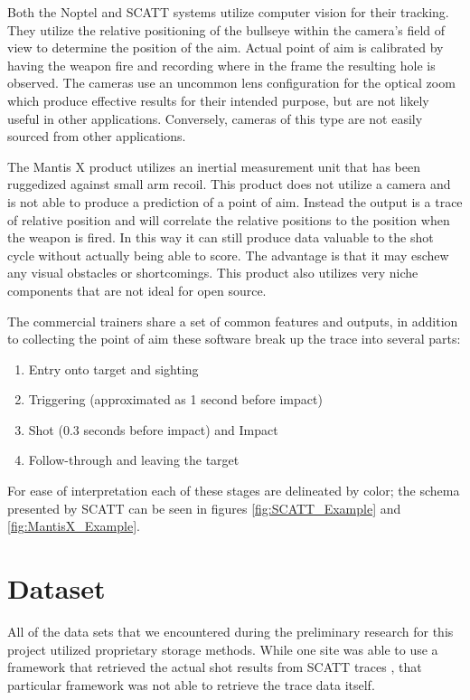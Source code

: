 \documentclass[conference]{IEEEtran}
\begin{document}
Both the Noptel and SCATT systems utilize computer vision for their tracking.
They utilize the relative positioning of the bullseye within the camera's field of view to determine the position of the aim.
Actual point of aim is calibrated by having the weapon fire and recording where in the frame the resulting hole is observed.
The cameras use an uncommon lens configuration for the optical zoom which produce effective results for their intended purpose, but are not likely useful in other applications.
Conversely, cameras of this type are not easily sourced from other applications.

The Mantis X \cite{mantisx} product utilizes an inertial measurement unit that has been ruggedized against small arm recoil. 
This product does not utilize a camera and is not able to produce a prediction of a point of aim.
Instead the output is a trace of relative position and will correlate the relative positions to the position when the weapon is fired.
In this way it can still produce data valuable to the shot cycle without actually being able to score.
The advantage is that it may eschew any visual obstacles or shortcomings.
This product also utilizes very niche components that are not ideal for open source.

The commercial trainers share a set of common features and outputs,
in addition to collecting the point of aim these software break up the trace into several parts:
\begin{enumerate}
	\item Entry onto target and sighting
	\item Triggering (approximated as 1 second before impact)
	\item Shot (0.3 seconds before impact)  and Impact
	\item Follow-through and leaving the target
\end{enumerate}
For ease of interpretation each of these stages are delineated by color; the schema presented by SCATT can be seen in figures 
\ref{fig:SCATT_Example} and
\ref{fig:MantisX_Example}.


\section{Dataset}

All of the data sets that we encountered during the preliminary research for this project utilized proprietary storage methods.
While one site was able to use a framework that retrieved the actual shot results from SCATT traces \cite{scatt-db}, that particular framework was not able to retrieve the trace data itself.
\end{document}
